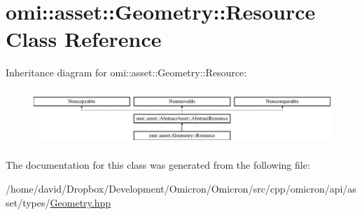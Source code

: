 \hypertarget{classomi_1_1asset_1_1_geometry_1_1_resource}{}\section{omi\+:\+:asset\+:\+:Geometry\+:\+:Resource Class Reference}
\label{classomi_1_1asset_1_1_geometry_1_1_resource}
Inheritance diagram for omi\+:\+:asset\+:\+:Geometry\+:\+:Resource\+:\begin{figure}[H]
\begin{center}
\leavevmode
\includegraphics[height=2.113208cm]{classomi_1_1asset_1_1_geometry_1_1_resource}
\end{center}
\end{figure}


The documentation for this class was generated from the following file\+:\begin{DoxyCompactItemize}
\item 
/home/david/\+Dropbox/\+Development/\+Omicron/\+Omicron/src/cpp/omicron/api/asset/types/\hyperlink{_geometry_8hpp}{Geometry.\+hpp}\end{DoxyCompactItemize}
